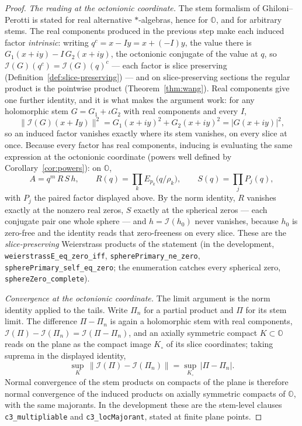 \documentclass[11pt]{article}
\newcommand{\OO}{\mathbb{O}}
\theoremstyle{plain}
\theoremstyle{definition}
\theoremstyle{remark}
\begin{document}
\begin{proof}
\emph{The reading at the octonionic coordinate.} The stem formalism of
Ghiloni--Perotti \cite[Def.~2.1, Prop.~2.2]{SeriesExp} is stated for real
alternative $\ast$-algebras, hence for $\OO$, and for arbitrary stems.
The real components produced in the previous step make each induced
factor \emph{intrinsic}: writing $q^{c}=x-Iy=x+(-I)y$, the value there is
$G_1(x+iy)-I\,G_2(x+iy)$, the octonionic conjugate of the value at $q$,
so $\mathcal I(G)(q^{c})=\mathcal I(G)(q)^{c}$ --- each factor is slice
preserving (Definition~\ref{def:slice-preserving}) --- and on
slice-preserving sections the regular product is the pointwise product
(Theorem~\ref{thm:wang}). Real components give one further identity, and
it is what makes the argument work: for any holomorphic stem
$G=G_1+\iota G_2$ with real components and every $I$,
\[
  \lVert\mathcal I(G)(x+Iy)\rVert^{2}
  =G_1(x+iy)^{2}+G_2(x+iy)^{2}
  =\lvert G(x+iy)\rvert^{2},
\]
so an induced factor vanishes exactly where its stem vanishes, on every
slice at once. Because every factor has real components, inducing is
evaluating the same expression at the octonionic coordinate (powers well
defined by Corollary~\ref{cor:powers}): on $\OO$,
\[
  A=q^{m}\,R\,S\,h,\qquad
  R(q)=\prod_{k}E_{p_k}\!\bigl(q/\rho_k\bigr),\qquad
  S(q)=\prod_{j}P_j(q),
\]
with $P_j$ the paired factor displayed above. By the norm identity, $R$
vanishes exactly at the nonzero real zeros, $S$ exactly at the spherical
zeros --- each conjugate pair one whole sphere --- and
$h=\mathcal I(h_0)$ never vanishes, because $h_0$ is zero-free and the
identity reads that zero-freeness on every slice. These are the
\emph{slice-preserving} Weierstrass products of the statement
\textup{(}in the development, \texttt{weierstrassE\_eq\_zero\_iff},
\texttt{spherePrimary\_ne\_zero}, \texttt{spherePrimary\_self\_eq\_zero};
the enumeration catches every spherical zero,
\texttt{sphereZero\_complete}\textup{)}.

\emph{Convergence at the octonionic coordinate.} The limit argument is
the norm identity applied to the tails. Write $\Pi_n$ for a partial
product and $\Pi$ for its stem limit. The difference $\Pi-\Pi_n$ is again
a holomorphic stem with real components,
$\mathcal I(\Pi)-\mathcal I(\Pi_n)=\mathcal I(\Pi-\Pi_n)$, and an axially
symmetric compact $K\subset\OO$ reads on the plane as the compact image
$K_\circ$ of its slice coordinates; taking suprema in the displayed
identity,
\[
  \sup_{K}\,\bigl\lVert\mathcal I(\Pi)-\mathcal I(\Pi_n)\bigr\rVert
  =\sup_{K_\circ}\,\lvert\Pi-\Pi_n\rvert .
\]
Normal convergence of the stem products on compacts of the plane is
therefore normal convergence of the induced products on axially symmetric
compacts of $\OO$, with the same majorants. In the development these are
the stem-level clauses \texttt{c3\_multipliable} and
\texttt{c3\_locMajorant}, stated at finite plane points.


\end{proof}
\end{document}
